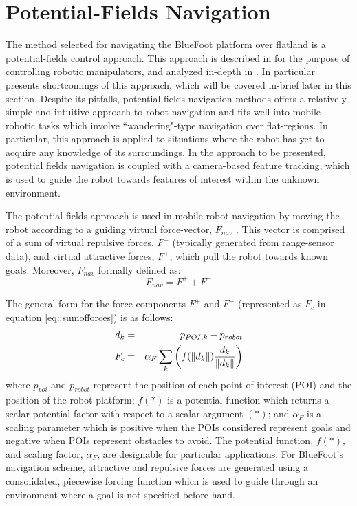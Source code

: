 	\section{Potential-Fields Navigation}

		The method selected for navigating the BlueFoot platform over flatland is a potential-fields control approach. This approach is described in \cite{Hogan1984} for the purpose of controlling robotic manipulators, and analyzed in-depth in \cite{Koren1991}. In particular \cite{Koren1991} presents shortcomings of this approach, which will be covered in-brief later in this section. Despite its pitfalls, potential fields navigation methods offers a relatively simple and intuitive approach to robot navigation and fits well into mobile robotic tasks which involve ``wandering"-type navigation over flat-regions. In particular, this approach is applied to situations where the robot has yet to acquire any knowledge of its surroundings. In the approach to be presented, potential fields navigation is coupled with a camera-based feature tracking, which is used to guide the robot towards features of interest within the unknown environment.

		The potential fields approach is used in mobile robot navigation by moving the robot according to a guiding virtual force-vector, $F_{nav}$ \cite{Koren1991,ArambulaCosio2004}. This vector is comprised of a sum of virtual repulsive forces, $F^{-}$ (typically generated from range-sensor data), and virtual attractive forces, $F^{+}$, which pull the robot towards known goals. Moreover, $F_{nav}$ formally defined as:
		\begin{equation}
			F_{nav} = F^{+} + F^{-}
			\label{eq::sumofforces}
		\end{equation}

		The general form for the force components $F^{+}$ and $F^{-}$ (represented as $F_{c}$ in equation \ref{eq::sumofforces}) is as follows:
		\begin{eqnarray}
			d_{k} 	&=& p_{POI,k} - p_{robot} \nonumber\\
			F_{c}	&=& \alpha_{F}\sum_{k}\left( f(\left\lVert d_{k}\right\rVert)\frac{d_{k}}{\left\lVert d_{k}\right\rVert} \right)
			\label{eq::sumofforces}
		\end{eqnarray}	
		where $p_{poi}$ and $p_{robot}$ represent the position of each \Kth point-of-interest (POI) and the position of the robot platform; $f(*)$ is a potential function which returns a scalar potential factor with respect to a scalar argument $(*)$; and $\alpha_{F}$ is a scaling parameter which is positive when the POIs considered represent goals and negative when POIs represent obstacles to avoid. The potential function, $f(*)$, and scaling factor, $\alpha_{F}$, are designable for particular applications. For BlueFoot's navigation scheme, attractive and repulsive forces are generated using a consolidated, piecewise forcing function which is used to guide through an environment where a goal is not specified before hand. 

